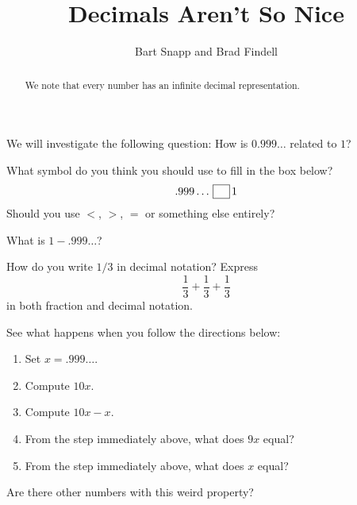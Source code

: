 \documentclass[nooutcomes]{ximera}
\title{Decimals Aren't So Nice}
\author{Bart Snapp and Brad Findell}
\begin{document}
\begin{abstract}
  We note that every number has an infinite decimal representation.
\end{abstract}
\maketitle

\label{A:DecNotNice}


We will investigate the following question: How is $0.999\dots$
related to $1$?



\begin{problem}
What symbol do you think you should use to fill in the box below?
\[
.999\dots \,\fbox{\rule[0mm]{0mm}{2mm}\hspace{2ex}}\, 1
\]
Should you use $<$, $>$, $=$ or something else entirely?
\end{problem}


\begin{problem}
What is $1 - .999\dots$?
\end{problem}

\begin{problem}
How do you write $1/3$ in decimal notation? Express
\[
\frac{1}{3} + \frac{1}{3} + \frac{1}{3}
\]
in both fraction and decimal notation.
\end{problem}

\begin{problem}
See what happens when you follow the directions below:
\begin{enumerate}
\item Set $x = .999\dots$.
\item Compute $10x$. 
\item Compute $10x-x$.
\item From the step immediately above, what does $9x$ equal?
\item From the step immediately above, what does $x$ equal?
\end{enumerate}
\end{problem}

\begin{problem}
Are there other numbers with this weird property?
\end{problem}
\end{document}
